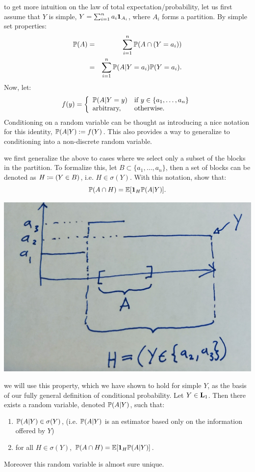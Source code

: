 \documentclass{article}
\begin{document}
 to get more intuition on the law of total expectation/probability, let us first assume that $Y$ is simple, $Y = \sum_{i=1}^n a_i \1_{A_i}$, where $A_i$ forms a partition. By simple set properties:
\begin{eqnarray*}
\P(A) &=& \sum_{i=1}^n \P(A \cap (Y=a_i)) \\
&=& \sum_{i=1}^n \P(A|Y=a_i) \P(Y = a_i).
\end{eqnarray*}
Now, let: 
\begin{equation} 
f(y) = \bracearraycond{
  \P(A|Y=y) &\text{if }y\in\{a_1, \dots, a_n\} \\ 
  \text{arbitrary,} & \text{otherwise.}
}
\end{equation}
Conditioning on a random variable can be thought as introducing a nice notation for this identity, $\P(A|Y) := f(Y)$. This also provides a way to generalize to conditioning into a non-discrete random variable.

 we first generalize the above to cases where we select only a subset of the blocks in the partition. To formalize this, let $B \subset \{a_1, \dots, a_n\}$, then a set of blocks can be denoted as $H \defeq (Y \in B)$, i.e. $H \in \sigma(Y)$. With this notation, show that:
\[ \P(A \cap H) = \E[ \1_H \P(A | Y)]. \]
\begin{center}
	\includegraphics[width=0.6\linewidth]{figures/law-of-total-pr} 
\end{center}

 we will use this property, which we have shown to hold for simple $Y$, as the basis of our fully general definition of conditional probability.  Let $Y \in \L_1$. Then there exists a random variable, denoted $\P(A|Y)$, such that:
\begin{enumerate}
  \item $\P(A|Y) \in \sigma(Y)$, (i.e. $\P(A|Y)$ is an estimator based only on the information offered by $Y$)
  \item for all $H \in \sigma(Y)$, $\P(A \cap H) = \E[ \1_H \P(A | Y)]$.
\end{enumerate} 
Moreover this random variable is almost sure unique.
\end{document}
